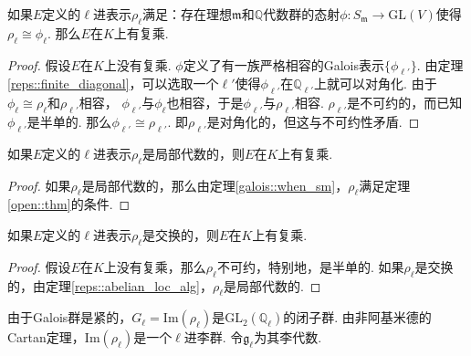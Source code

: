 \begin{cthm}
    如果$E$定义的$\ell$进表示$\rho_{\ell}$满足：存在理想$\mathfrak{m}$和$\mathbb{Q}$代数群的态射$\phi: S_{\mathfrak{m}}\to \mathrm{GL}(V)$使得$\rho_{\ell} \cong \phi_{\ell}$. 那么$E$在$K$上有复乘.\label{open::thm}
\end{cthm}

\begin{proof}
    假设$E$在$K$上没有复乘.
    $\phi$定义了有一族严格相容的Galois表示$\{\phi_{\ell'}\}$.
    由定理\ref{reps::finite_diagonal}，可以选取一个$\ell'$使得$\phi_{\ell'}$在$\mathbb{Q}_{\ell'}$上就可以对角化. 
    由于$\phi_{\ell}\cong\rho_{\ell}$和$\rho_{\ell'}$相容，
    $\phi_{\ell'}$与$\phi_{\ell}$也相容，于是$\phi_{\ell'}$与$\rho_{\ell'}$相容.
    $\rho_{\ell'}$是不可约的，而已知$\phi_{\ell'}$是半单的. 那么$\phi_{\ell'}\cong \rho_{\ell'}$.
    即$\rho_{\ell'}$是对角化的，但这与不可约性矛盾.
\end{proof}

\begin{ccor}
    如果$E$定义的$\ell$进表示$\rho_{\ell}$是局部代数的，则$E$在$K$上有复乘. \label{reps::when_cm}
\end{ccor}

\begin{proof}
    如果$\rho_{\ell}$是局部代数的，那么由定理\ref{galois::when_sm}，$\rho_{\ell}$满足定理\ref{open::thm}的条件.
\end{proof}

\begin{ccor}
    如果$E$定义的$\ell$进表示$\rho_{\ell}$是交换的，则$E$在$K$上有复乘.
\end{ccor}

\begin{proof}
    假设$E$在$K$上没有复乘，那么$\rho_{\ell}$不可约，特别地，是半单的.
    如果$\rho_{\ell}$是交换的，由定理\ref{reps::abelian_loc_alg}，$\rho_{\ell}$是局部代数的.
\end{proof}

由于Galois群是紧的，$G_{\ell} = \mathrm{Im}(\rho_\ell)$是$\mathrm{GL}_2(\mathbb{Q}_{\ell})$的闭子群. 由非阿基米德的Cartan定理{\parencite[][p. 155]{serre2009lie}}，$\mathrm{Im}(\rho_{\ell})$是一个$\ell$进李群. 令$\mathfrak{g}_{\ell}$为其李代数.

